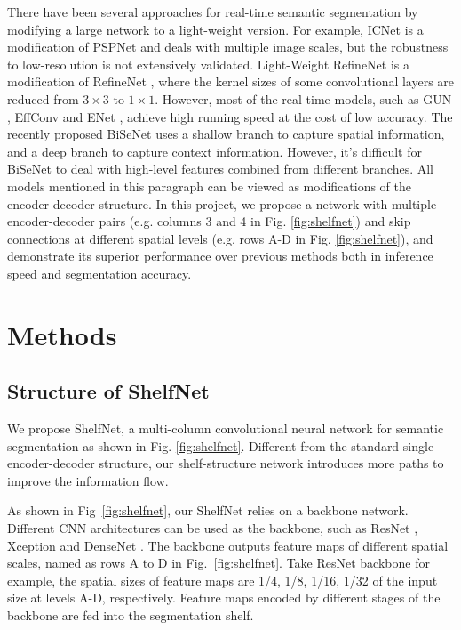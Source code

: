 \documentclass[10pt,twocolumn,letterpaper]{article}
\begin{document}
There have been several approaches for real-time semantic segmentation by modifying a large network to a light-weight version. For example, ICNet \cite{zhao2017icnet} is a modification of PSPNet and deals with multiple image scales, but the robustness to low-resolution is not extensively validated. Light-Weight RefineNet is a modification of RefineNet \cite{nekrasov2018light}, where the kernel sizes of some convolutional layers are reduced from $3\times3$ to $1\times1$. However, most of the real-time models, such as GUN \cite{mazzini2018guided}, EffConv \cite{romera2017efficient} and ENet \cite{paszke2016enet}, achieve high running speed at the cost of low accuracy. The recently proposed BiSeNet
\cite{yu2018bisenet} uses a shallow branch to capture spatial information, and a deep branch to capture context information. However, it's difficult for BiSeNet to deal with high-level features combined from different branches. All models mentioned in this paragraph can be viewed as modifications of the encoder-decoder structure. In this project, we propose a network with multiple encoder-decoder pairs (e.g. columns 3 and 4 in Fig. \ref{fig:shelfnet}) and skip connections at different spatial levels (e.g. rows A-D in Fig. \ref{fig:shelfnet}), and demonstrate its superior performance over previous methods both in inference speed and segmentation accuracy.

\section{Methods}
\label{methods}
\subsection{Structure of ShelfNet}
We propose ShelfNet, a multi-column convolutional neural network for semantic segmentation as shown in Fig. \ref{fig:shelfnet}. Different from the standard single encoder-decoder structure, our shelf-structure network introduces more paths to improve the information flow. 
  
As shown in Fig~\ref{fig:shelfnet}, our ShelfNet relies on a backbone network. Different CNN architectures can be used as the backbone, such as ResNet \cite{he2016deep}, Xception \cite{chollet2017xception} and DenseNet \cite{huang2017densely}. The backbone outputs feature maps of different spatial scales, named as rows A to D in Fig.~\ref{fig:shelfnet}. Take ResNet backbone for example, the spatial sizes of feature maps are 1/4, 1/8, 1/16, 1/32 of the input size at levels A-D, respectively. Feature maps encoded by different stages of the backbone are fed into the segmentation shelf. 
  
\end{document}
